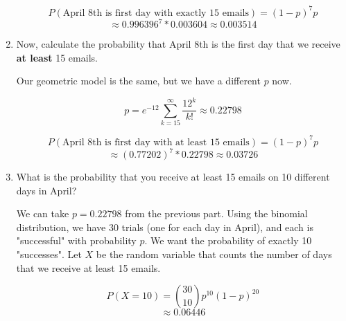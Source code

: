 \begin{enumerate}[label=(\alph*)]
\begin{solution}[2cm]
$$P(\text{April 8th is first day with exactly 15 emails}) = (1-p)^7 p$$
$$\approx 0.996396^7 * 0.003604 \approx 0.003514$$
\end{solution}

\item Now, calculate the probability that April 8th is the first day that we receive \textbf{at least} 15 emails.
\begin{solution}[2cm]
Our geometric model is the same, but we have a different $p$ now.

$$p = e^{-12} \sum_{k = 15}^\infty \frac{12^k}{k!} \approx 0.22798$$

$$P(\text{April 8th is first day with at least 15 emails}) = (1-p)^7 p$$
$$\approx (0.77202)^7 * 0.22798 \approx 0.03726$$
\end{solution}

\item What is the probability that you receive at least 15 emails on 10 different days in April?
\begin{solution}[2cm]
We can take $p = 0.22798$ from the previous part. Using the binomial distribution, we have 30 trials (one for each day in April), and each is "successful" with probability $p$. We want the probability of exactly 10 "successes". Let $X$ be the random variable that counts the number of days that we receive at least 15 emails.

$$P(X = 10) = {30 \choose 10} p^{10} (1-p)^{20}$$
$$\approx 0.06446$$
\end{solution}

\end{enumerate}

\begin{comment}
\item What is the probability that you receive at least 15 emails on at least 15 days in April?
\begin{solution}[2cm]
$$P(X \geq 15) = P(X = 15) + P(X = 16) + ... + P(X = 30)$$
$$= \sum_{k = 15}^{30} {30 \choose k} 0.22798^k 0.77202^{30-k} \approx 0.00102$$
\end{solution}
\end{comment}